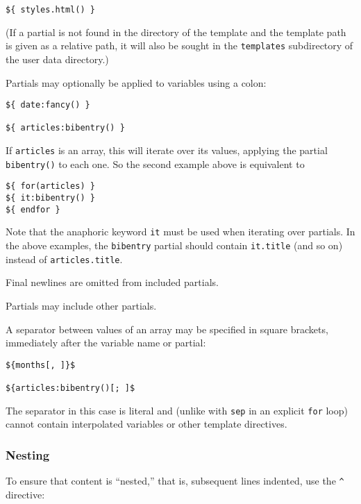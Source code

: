 \documentclass[
]{article}
\begin{document}
\begin{verbatim}
${ styles.html() }
\end{verbatim}

(If a partial is not found in the directory of the template and the
template path is given as a relative path, it will also be sought in the
\texttt{templates} subdirectory of the user data directory.)

Partials may optionally be applied to variables using a colon:

\begin{verbatim}
${ date:fancy() }

${ articles:bibentry() }
\end{verbatim}

If \texttt{articles} is an array, this will iterate over its values,
applying the partial \texttt{bibentry()} to each one. So the second
example above is equivalent to

\begin{verbatim}
${ for(articles) }
${ it:bibentry() }
${ endfor }
\end{verbatim}

Note that the anaphoric keyword \texttt{it} must be used when iterating
over partials. In the above examples, the \texttt{bibentry} partial
should contain \texttt{it.title} (and so on) instead of
\texttt{articles.title}.

Final newlines are omitted from included partials.

Partials may include other partials.

A separator between values of an array may be specified in square
brackets, immediately after the variable name or partial:

\begin{verbatim}
${months[, ]}$

${articles:bibentry()[; ]$
\end{verbatim}

The separator in this case is literal and (unlike with \texttt{sep} in
an explicit \texttt{for} loop) cannot contain interpolated variables or
other template directives.

\subsubsection{Nesting}\label{nesting}

To ensure that content is ``nested,'' that is, subsequent lines
indented, use the \texttt{\^{}} directive:
\end{document}
